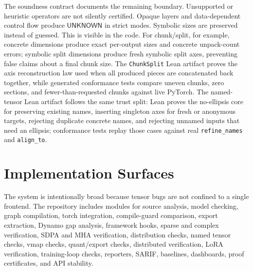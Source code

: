 \documentclass[11pt]{article}
\newcommand{\unknown}{\ensuremath{\mathsf{UNKNOWN}}}
\begin{document}
The soundness contract documents the remaining boundary.  Unsupported or
heuristic operators are not silently certified.  Opaque layers and
data-dependent control flow produce \unknown{} in strict modes.  Symbolic sizes
are preserved instead of guessed.  This is visible in the code.  For chunk/split,
for example, concrete dimensions produce exact per-output sizes and concrete
unpack-count errors; symbolic split dimensions produce fresh symbolic split
axes, preventing false claims about a final chunk size.  The
\texttt{ChunkSplit} Lean artifact proves the axis reconstruction law used when
all produced pieces are concatenated back together, while generated conformance
tests compare uneven chunks, zero sections, and fewer-than-requested chunks
against live PyTorch.  The named-tensor Lean artifact follows the same trust
split: Lean proves the no-ellipsis core for preserving existing names, inserting
singleton axes for fresh or anonymous targets, rejecting duplicate concrete
names, and rejecting unnamed inputs that need an ellipsis; conformance tests
replay those cases against real \texttt{refine\_names} and \texttt{align\_to}.

\clearpage

\section{Implementation Surfaces}

The system is intentionally broad because tensor bugs are not confined to a
single frontend.  The repository includes modules for source analysis, model
checking, graph compilation, torch integration, compile-guard comparison, export extraction, Dynamo gap
analysis, framework hooks, sparse and complex verification, SDPA and MHA
verification, distribution checks, named tensor checks, vmap checks, quant/export
checks, distributed verification, LoRA verification, training-loop checks,
reporters, SARIF, baselines, dashboards, proof certificates, and API stability.
\end{document}

